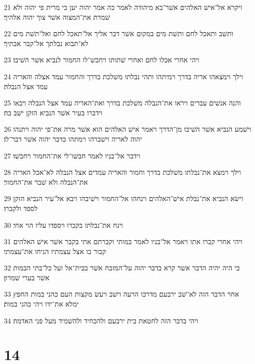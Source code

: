 \par 21 ויקרא אל־אישׁ האלהים אשׁר־בא מיהודה לאמר כה אמר יהוה יען כי מרית פי יהוה ולא שׁמרת את־המצוה אשׁר צוך יהוה אלהיך׃
\par 22 ותשׁב ותאכל לחם ותשׁת מים במקום אשׁר דבר אליך אל־תאכל לחם ואל־תשׁת מים לא־תבוא נבלתך אל־קבר אבתיך׃
\par 23 ויהי אחרי אכלו לחם ואחרי שׁתותו ויחבשׁ־לו החמור לנביא אשׁר השׁיבו׃
\par 24 וילך וימצאהו אריה בדרך וימיתהו ותהי נבלתו משׁלכת בדרך והחמור עמד אצלה והאריה עמד אצל הנבלה׃
\par 25 והנה אנשׁים עברים ויראו את־הנבלה משׁלכת בדרך ואת־האריה עמד אצל הנבלה ויבאו וידברו בעיר אשׁר הנביא הזקן ישׁב בה׃
\par 26 וישׁמע הנביא אשׁר השׁיבו מן־הדרך ויאמר אישׁ האלהים הוא אשׁר מרה את־פי יהוה ויתנהו יהוה לאריה וישׁברהו וימתהו כדבר יהוה אשׁר דבר־לו׃
\par 27 וידבר אל־בניו לאמר חבשׁו־לי את־החמור ויחבשׁו׃
\par 28 וילך וימצא את־נבלתו משׁלכת בדרך וחמור והאריה עמדים אצל הנבלה לא־אכל האריה את־הנבלה ולא שׁבר את־החמור׃
\par 29 וישׂא הנביא את־נבלת אישׁ־האלהים וינחהו אל־החמור וישׁיבהו ויבא אל־עיר הנביא הזקן לספד ולקברו׃
\par 30 וינח את־נבלתו בקברו ויספדו עליו הוי אחי׃
\par 31 ויהי אחרי קברו אתו ויאמר אל־בניו לאמר במותי וקברתם אתי בקבר אשׁר אישׁ האלהים קבור בו אצל עצמתיו הניחו את־עצמתי׃
\par 32 כי היה יהיה הדבר אשׁר קרא בדבר יהוה על־המזבח אשׁר בבית־אל ועל כל־בתי הבמות אשׁר בערי שׁמרון׃
\par 33 אחר הדבר הזה לא־שׁב ירבעם מדרכו הרעה וישׁב ויעשׂ מקצות העם כהני במות החפץ ימלא את־ידו ויהי כהני במות׃
\par 34 ויהי בדבר הזה לחטאת בית ירבעם ולהכחיד ולהשׁמיד מעל פני האדמה׃

\chapter{14}

